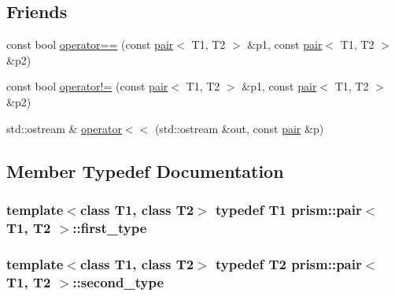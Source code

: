 \subsection*{Friends}
\begin{DoxyCompactItemize}
\item 
const bool \hyperlink{structprism_1_1pair_ad7e2c2e8725c7ae941527a9859305b4a}{operator==} (const \hyperlink{structprism_1_1pair}{pair}$<$ T1, T2 $>$ \&p1, const \hyperlink{structprism_1_1pair}{pair}$<$ T1, T2 $>$ \&p2)
\item 
const bool \hyperlink{structprism_1_1pair_a5862e188719368db9f883f7a078f6778}{operator!=} (const \hyperlink{structprism_1_1pair}{pair}$<$ T1, T2 $>$ \&p1, const \hyperlink{structprism_1_1pair}{pair}$<$ T1, T2 $>$ \&p2)
\item 
std\+::ostream \& \hyperlink{structprism_1_1pair_ad79aaf53f199a130673f004de0ce4ea8}{operator$<$$<$} (std\+::ostream \&out, const \hyperlink{structprism_1_1pair}{pair} \&p)
\end{DoxyCompactItemize}


\subsection{Member Typedef Documentation}
\subsubsection[{\texorpdfstring{first\+\_\+type}{first_type}}]{\setlength{\rightskip}{0pt plus 5cm}template$<$class T1, class T2$>$ typedef T1 {\bf prism\+::pair}$<$ T1, T2 $>$\+::{\bf first\+\_\+type}}\hypertarget{structprism_1_1pair_a06bf88c0e5cb126378e584c53b81a030}{}\label{structprism_1_1pair_a06bf88c0e5cb126378e584c53b81a030}
\subsubsection[{\texorpdfstring{second\+\_\+type}{second_type}}]{\setlength{\rightskip}{0pt plus 5cm}template$<$class T1, class T2$>$ typedef T2 {\bf prism\+::pair}$<$ T1, T2 $>$\+::{\bf second\+\_\+type}}\hypertarget{structprism_1_1pair_a396e6009645d217824d896f8ba71c3da}{}\label{structprism_1_1pair_a396e6009645d217824d896f8ba71c3da}


